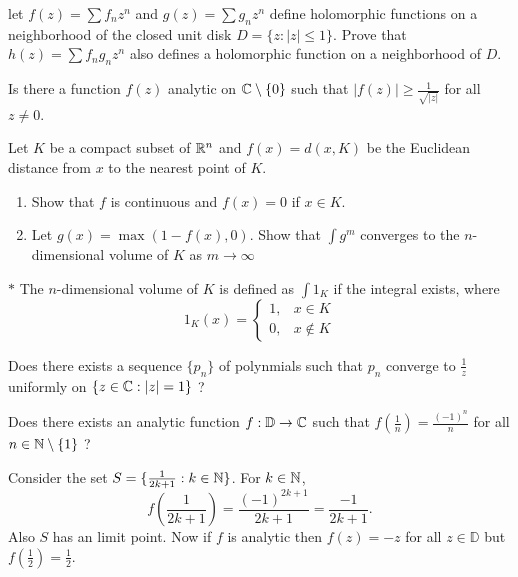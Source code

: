 \question[5B, Sp16] let $f(z)=\sum{f_nz^n}$ and $g(z)=\sum{g_nz^n}$ define holomorphic functions on a neighborhood of the closed unit disk $D=\{z: |z|\leq1\}$. Prove that $h(z)=\sum{f_ng_nz^n}$ also defines a holomorphic function on a neighborhood of $D$.

\question[5A, Fall16] Is there a function $f(z)$ analytic on $\mathbb{C}\setminus\{0\}$ such that $|f(z)|\geq\frac{1}{\sqrt{|z|}}$ for all $z\neq0$.

\question[2B, Fall16] Let $K$ be a compact subset of $\mathbb{R}^n$ and $f(x)=d(x,K)$ be the Euclidean distance from $x$ to the nearest point of $K$.
\begin{enumerate}
    \item Show that $f$ is continuous and $f(x)=0$ if $x\in K$.
    \item Let $g(x)=\max(1-f(x),0)$. Show that $\int{g^m}$ converges to the $n$-dimensional volume of $K$ as $m\to\infty$
\end{enumerate}
$\mathbf{*}$ The $n$-dimensional volume of $K$ is defined as $\int{1_K}$ if the integral exists, where
$$1_K(x)=\begin{cases}
    1, & x\in K\\
    0, & x\notin K
\end{cases}$$

\question Does there exists a sequence $\{p_n\}$ of polynmials such that $p_n$ converge to $\frac{1}{z}$ uniformly on $\{z\in\mathbb{C} : |z|=1\}$ ?

\question Does there exists an analytic function $f:\mathbb{D}\to\mathbb{C}$ such that $f\left(\frac{1}{n}\right)=\frac{(-1)^n}{n}$ for all $n\in\mathbb{N}\setminus\{1\}$ ?
\begin{solution}
    Consider the set $S=\{\frac{1}{2k+1}: k\in\mathbb{N}\}$. For $k\in\mathbb{N}$, $$f\left(\frac{1}{2k+1}\right)=\frac{(-1)^{2k+1}}{2k+1}=\frac{-1}{2k+1}.$$ Also $S$ has an limit point. Now if $f$ is analytic then $f(z)=-z$ for all $z\in\mathbb{D}$ but $f\left(\frac{1}{2}\right)=\frac{1}{2}$.
\end{solution}

